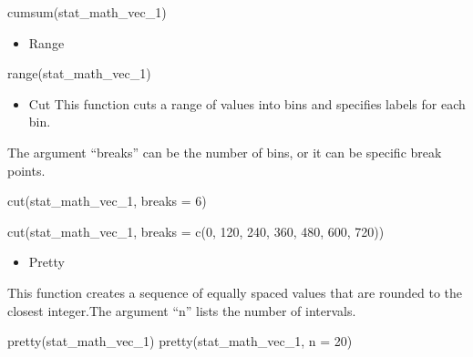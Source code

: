 \documentclass[
  letterpaper,
  DIV=11,
  numbers=noendperiod]{scrreprt}
\newenvironment{Shaded}{}{}
\newcommand{\AttributeTok}[1]{\textcolor[rgb]{0.84,0.23,0.29}{#1}}
\newcommand{\DecValTok}[1]{\textcolor[rgb]{0.00,0.36,0.77}{#1}}
\newcommand{\FunctionTok}[1]{\textcolor[rgb]{0.44,0.26,0.76}{#1}}
\newcommand{\NormalTok}[1]{\textcolor[rgb]{0.14,0.16,0.18}{#1}}
\providecommand{\tightlist}{%
  \setlength{\itemsep}{0pt}\setlength{\parskip}{0pt}}\usepackage{longtable,booktabs,array}
\begin{document}
\begin{Shaded}
\begin{Highlighting}[]
\FunctionTok{cumsum}\NormalTok{(stat\_math\_vec\_1)}
\end{Highlighting}
\end{Shaded}

\begin{itemize}
\tightlist
\item
  Range
\end{itemize}

\begin{Shaded}
\begin{Highlighting}[]
\FunctionTok{range}\NormalTok{(stat\_math\_vec\_1)}
\end{Highlighting}
\end{Shaded}

\begin{itemize}
\tightlist
\item
  Cut This function cuts a range of values into bins and specifies
  labels for each bin.
\end{itemize}

The argument ``breaks'' can be the number of bins, or it can be specific
break points.

\begin{Shaded}
\begin{Highlighting}[]
\FunctionTok{cut}\NormalTok{(stat\_math\_vec\_1, }\AttributeTok{breaks =} \DecValTok{6}\NormalTok{)}

\FunctionTok{cut}\NormalTok{(stat\_math\_vec\_1, }\AttributeTok{breaks =} \FunctionTok{c}\NormalTok{(}\DecValTok{0}\NormalTok{, }\DecValTok{120}\NormalTok{, }\DecValTok{240}\NormalTok{, }\DecValTok{360}\NormalTok{, }\DecValTok{480}\NormalTok{, }\DecValTok{600}\NormalTok{, }\DecValTok{720}\NormalTok{))}
\end{Highlighting}
\end{Shaded}

\begin{itemize}
\tightlist
\item
  Pretty
\end{itemize}

This function creates a sequence of equally spaced values that are
rounded to the closest integer.The argument ``n'' lists the number of
intervals.

\begin{Shaded}
\begin{Highlighting}[]
\FunctionTok{pretty}\NormalTok{(stat\_math\_vec\_1)}
\FunctionTok{pretty}\NormalTok{(stat\_math\_vec\_1, }\AttributeTok{n =} \DecValTok{20}\NormalTok{)}
\end{Highlighting}
\end{Shaded}
\end{document}
